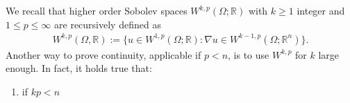 We recall that higher order Sobolev spaces \(W^{k,p}(\Omega; \mathbb{R})\) with \(k \geq 1\) integer and \(1 \leq p \leq \infty \) are recursively defined as 
\begin{gather}
    W^{k,p}(\Omega, \mathbb{R}):= \{ u \in W^{1,p}(\Omega; \mathbb{R}): \nabla u \in W^{k-1,p}(\Omega; \mathbb{R}^{n})\}.
\end{gather}
Another way to prove continuity, applicable if \(p < n\), is to use \(W^{k,p}\) for \(k\) large enough. In fact, it holds true that:
\begin{enumerate}[label= (\arabic*)]
    \item if \(kp<n\) 
\end{enumerate}
